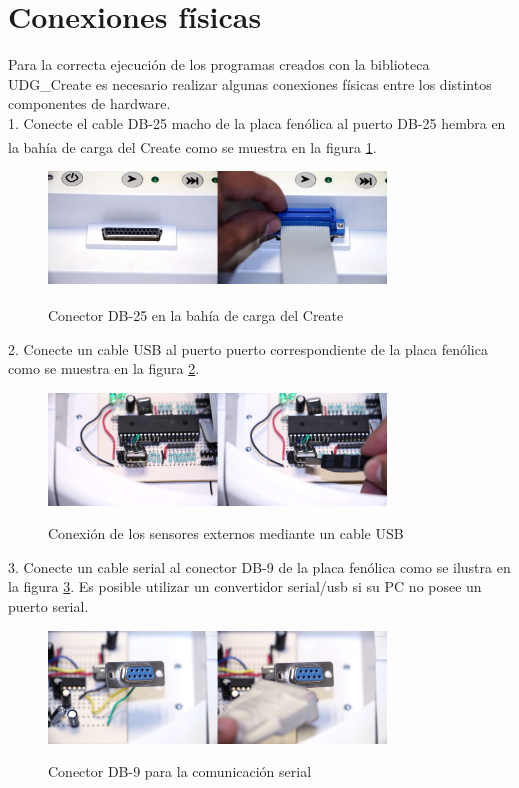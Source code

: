 \documentclass[letterpaper,openright,12pt]{book}
\begin{document}
\section{Conexiones físicas}
Para la correcta ejecución de los programas creados con la biblioteca UDG\_Create es necesario realizar algunas conexiones físicas entre los distintos componentes de hardware.\\
1. Conecte el cable DB-25 macho de la placa fenólica al puerto DB-25 hembra en la bahía de carga del Create\textsuperscript{\textregistered} como se muestra en la figura \ref{fig:cargoCable}.\\
\begin{figure}
\begin{center}
\includegraphics[width=0.8\textwidth]{figures/cargo.jpg}
\caption{Conector DB-25 en la bahía de carga del Create\textsuperscript{\textregistered}}
\centering
\label{fig:cargoCable}
\end{center}
\end{figure} 
2. Conecte un cable USB al puerto puerto correspondiente de la placa fenólica como se muestra en la figura \ref{fig:usbCable}.\\
\begin{figure}
\begin{center}
\includegraphics[width=0.8\textwidth]{figures/usbcable.jpg}
\caption{Conexión de los sensores externos mediante un cable USB}
\centering
\label{fig:usbCable}
\end{center}
\end{figure} 
3. Conecte un cable serial al conector DB-9 de la placa fenólica como se ilustra en la figura \ref{fig:serialCable}. Es posible utilizar un convertidor serial/usb si su PC no posee un puerto serial.\\
\begin{figure}
\begin{center}
\includegraphics[width=0.8\textwidth]{figures/serialcable.jpg}
\caption{Conector DB-9 para la comunicación serial}
\centering
\label{fig:serialCable}
\end{center}
\end{figure} 
\end{document}
